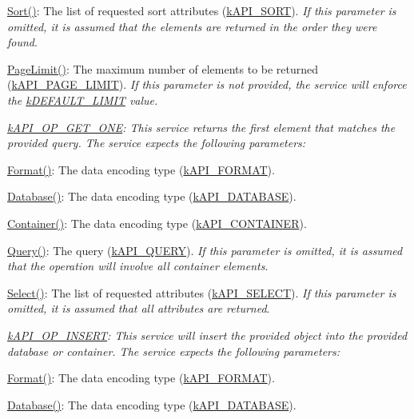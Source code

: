 \begin{DoxyItemize}
\begin{DoxyItemize}
\item {\ttfamily \hyperlink{}{Sort()}}\-: The list of requested sort attributes (\hyperlink{}{k\-A\-P\-I\-\_\-\-S\-O\-R\-T}). {\itshape If this parameter is omitted, it is assumed that the elements are returned in the order they were found}. 
\item {\ttfamily \hyperlink{}{Page\-Limit()}}\-: The maximum number of elements to be returned (\hyperlink{}{k\-A\-P\-I\-\_\-\-P\-A\-G\-E\-\_\-\-L\-I\-M\-I\-T}). {\itshape If this parameter is not provided, the service will enforce the \hyperlink{}{k\-D\-E\-F\-A\-U\-L\-T\-\_\-\-L\-I\-M\-I\-T} value. }
\end{DoxyItemize}
\item {\itshape {\ttfamily \hyperlink{}{k\-A\-P\-I\-\_\-\-O\-P\-\_\-\-G\-E\-T\-\_\-\-O\-N\-E}}\-: This service returns the first element that matches the provided query. The service expects the following parameters\-: 
\begin{DoxyItemize}
\item {\ttfamily \hyperlink{}{Format()}}\-: The data encoding type (\hyperlink{}{k\-A\-P\-I\-\_\-\-F\-O\-R\-M\-A\-T}). 
\item {\ttfamily \hyperlink{}{Database()}}\-: The data encoding type (\hyperlink{}{k\-A\-P\-I\-\_\-\-D\-A\-T\-A\-B\-A\-S\-E}). 
\item {\ttfamily \hyperlink{}{Container()}}\-: The data encoding type (\hyperlink{}{k\-A\-P\-I\-\_\-\-C\-O\-N\-T\-A\-I\-N\-E\-R}). 
\item {\ttfamily \hyperlink{}{Query()}}\-: The query (\hyperlink{}{k\-A\-P\-I\-\_\-\-Q\-U\-E\-R\-Y}). {\itshape If this parameter is omitted, it is assumed that the operation will involve all container elements}. 
\item {\ttfamily \hyperlink{}{Select()}}\-: The list of requested attributes (\hyperlink{}{k\-A\-P\-I\-\_\-\-S\-E\-L\-E\-C\-T}). {\itshape If this parameter is omitted, it is assumed that all attributes are returned}. 
\end{DoxyItemize}}
\item {\itshape {\ttfamily \hyperlink{}{k\-A\-P\-I\-\_\-\-O\-P\-\_\-\-I\-N\-S\-E\-R\-T}}\-: This service will insert the provided object into the provided database or container. The service expects the following parameters\-: 
\begin{DoxyItemize}
\item {\ttfamily \hyperlink{}{Format()}}\-: The data encoding type (\hyperlink{}{k\-A\-P\-I\-\_\-\-F\-O\-R\-M\-A\-T}). 
\item {\ttfamily \hyperlink{}{Database()}}\-: The data encoding type (\hyperlink{}{k\-A\-P\-I\-\_\-\-D\-A\-T\-A\-B\-A\-S\-E}). 

\end{DoxyItemize}}
\end{DoxyItemize}
